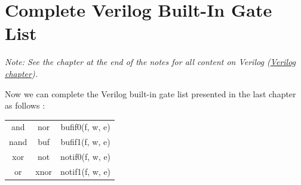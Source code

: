 \documentclass[12pt,openany]{book}
\begin{document}
\noindent
{}

\section{Complete Verilog Built-In Gate List}
 \textit{Note: See the chapter at the end of the notes for all content on Verilog (\hyperref[Verilog]{Verilog chapter}).}

Now we can complete the Verilog built-in gate list presented in the last chapter as follows :
\begin{center}
	\begin{tabular}{c|c|c}
		and  & nor & bufif0(f, w, e)  \\
		nand & buf & bufif1(f, w, e)  \\
		xor  & not & notif0(f, w, e) \\
		or   & xnor & notif1(f, w, e) \\
	\end{tabular}

\end{center}
\end{document}
